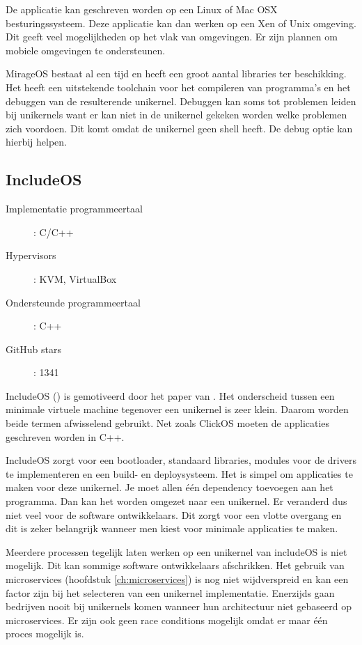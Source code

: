 \documentclass[pdftex,a4paper,12pt,twoside]{report}
\begin{document}
De applicatie kan geschreven worden op een Linux of Mac OSX besturingssysteem. Deze applicatie kan dan werken op een Xen of Unix omgeving. Dit geeft veel mogelijkheden op het vlak van omgevingen. Er zijn plannen om mobiele omgevingen te ondersteunen.

MirageOS bestaat al een tijd en heeft een groot aantal libraries ter beschikking. Het heeft een uitstekende toolchain voor het compileren van programma's en het debuggen van de resulterende unikernel. Debuggen kan soms tot problemen leiden bij unikernels want er kan niet in de unikernel gekeken worden welke problemen zich voordoen. Dit komt omdat de unikernel geen shell heeft. De debug optie kan hierbij helpen.

\subsection{IncludeOS}
\begin{description}
  \item [Implementatie programmeertaal]: C/C++
  \item [Hypervisors]: KVM, VirtualBox
  \item [Ondersteunde programmeertaal]: C++
  \item [GitHub stars]: 1341
\end{description}

IncludeOS (\cite{oslo_and_akershus_university_college_hioa-cs/includeos_????}) is gemotiveerd door het paper van \cite{bratterud_maximizing_2013}. Het onderscheid tussen een minimale virtuele machine tegenover een unikernel is zeer klein. Daarom worden beide termen afwisselend gebruikt. Net zoals ClickOS moeten de applicaties geschreven worden in C++.

IncludeOS zorgt voor een bootloader, standaard libraries, modules voor de drivers te implementeren en een build- en deploysysteem. Het is simpel om applicaties te maken voor deze unikernel. Je moet allen één dependency toevoegen aan het programma. Dan kan het worden omgezet naar een unikernel. Er veranderd dus niet veel voor de software ontwikkelaars. Dit zorgt voor een vlotte overgang en dit is zeker belangrijk wanneer men kiest voor minimale applicaties te maken.

Meerdere processen tegelijk laten werken op een unikernel van includeOS is niet mogelijk. Dit kan sommige software ontwikkelaars afschrikken. Het gebruik van microservices (hoofdstuk \ref{ch:microservices}) is nog niet wijdverspreid en kan een factor zijn bij het selecteren van een unikernel implementatie. Enerzijds gaan bedrijven nooit bij unikernels komen wanneer hun architectuur niet gebaseerd op microservices. Er zijn ook geen race conditions mogelijk omdat er maar één proces mogelijk is.
\end{document}
